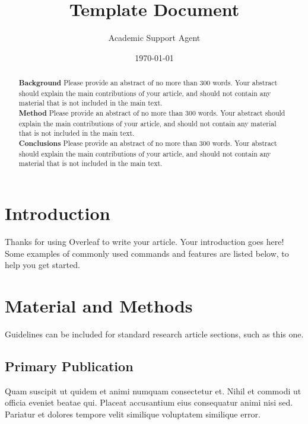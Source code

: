 \documentclass{article}
\title{Template Document}
\author{Academic Support Agent}
\date{\today}
\begin{document}
\maketitle

\maketitle

\begin{abstract}
\textbf{Background} Please provide an abstract of no more than 300 words. Your abstract should explain the main contributions of your article, and should not contain any material that is not included in the main text.\\
\textbf{Method} Please provide an abstract of no more than 300 words. Your abstract should explain the main contributions of your article, and should not contain any material that is not included in the main text.
\\ \textbf{Conclusions} Please provide an abstract of no more than 300 words. Your abstract should explain the main contributions of your article, and should not contain any material that is not included in the main text.
\end{abstract}



\section{Introduction}

Thanks for using Overleaf to write your article. Your introduction goes here! Some examples of commonly used commands and features are listed below, to help you get started.

\section{Material and Methods}

Guidelines can be included for standard research article sections, such as this one. 

\subsection{Primary Publication}

Quam suscipit ut quidem et animi numquam consectetur et. Nihil et commodi ut officia eveniet beatae qui. Placeat accusantium eius consequatur animi nisi sed. Pariatur et dolores tempore velit similique voluptatem similique error.
\end{document}
